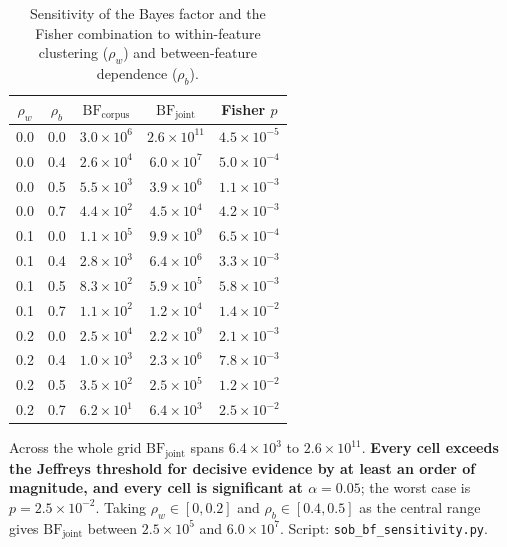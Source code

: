 \documentclass[11pt,a4paper]{article}
\begin{document}
\begin{table}[h]
\centering
\begin{threeparttable}
  \caption{Sensitivity of the Bayes factor and the Fisher combination to
    within-feature clustering ($\rho_w$) and between-feature dependence
    ($\rho_b$).}\label{tab:bfsens}
\begin{tabular}{@{}ccccc@{}}
\toprule
$\rho_w$ & $\rho_b$ & $\mathrm{BF}_\text{corpus}$ &
  $\mathrm{BF}_\text{joint}$ & Fisher $p$ \\
\midrule
0.0 & 0.0 & $3.0\times10^{6}$ & $2.6\times10^{11}$ & $4.5\times10^{-5}$ \\
0.0 & 0.4 & $2.6\times10^{4}$ & $6.0\times10^{7}$  & $5.0\times10^{-4}$ \\
0.0 & 0.5 & $5.5\times10^{3}$ & $3.9\times10^{6}$  & $1.1\times10^{-3}$ \\
0.0 & 0.7 & $4.4\times10^{2}$ & $4.5\times10^{4}$  & $4.2\times10^{-3}$ \\
\midrule
0.1 & 0.0 & $1.1\times10^{5}$ & $9.9\times10^{9}$  & $6.5\times10^{-4}$ \\
0.1 & 0.4 & $2.8\times10^{3}$ & $6.4\times10^{6}$  & $3.3\times10^{-3}$ \\
0.1 & 0.5 & $8.3\times10^{2}$ & $5.9\times10^{5}$  & $5.8\times10^{-3}$ \\
0.1 & 0.7 & $1.1\times10^{2}$ & $1.2\times10^{4}$  & $1.4\times10^{-2}$ \\
\midrule
0.2 & 0.0 & $2.5\times10^{4}$ & $2.2\times10^{9}$  & $2.1\times10^{-3}$ \\
0.2 & 0.4 & $1.0\times10^{3}$ & $2.3\times10^{6}$  & $7.8\times10^{-3}$ \\
0.2 & 0.5 & $3.5\times10^{2}$ & $2.5\times10^{5}$  & $1.2\times10^{-2}$ \\
0.2 & 0.7 & $6.2\times10^{1}$ & $6.4\times10^{3}$  & $2.5\times10^{-2}$ \\
\bottomrule
\end{tabular}
  \begin{tablenotes}
    \footnotesize
    \item Across the whole grid $\mathrm{BF}_\text{joint}$ spans
    $6.4\times10^{3}$ to $2.6\times10^{11}$. \textbf{Every cell exceeds the
    Jeffreys threshold for decisive evidence by at least an order of
    magnitude, and every cell is significant at $\alpha=0.05$}; the
    worst case is $p = 2.5\times10^{-2}$.
    Taking $\rho_w \in [0, 0.2]$ and $\rho_b \in [0.4, 0.5]$ as the central
    range gives $\mathrm{BF}_\text{joint}$ between $2.5\times10^{5}$ and
    $6.0\times10^{7}$. Script: \texttt{sob\_bf\_sensitivity.py}.
  \end{tablenotes}
\end{threeparttable}
\end{table}
\end{document}
